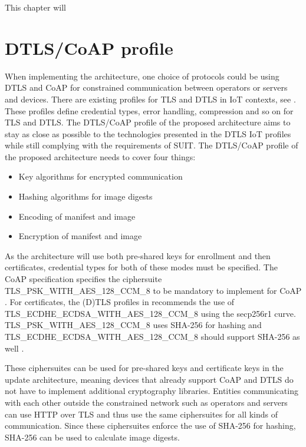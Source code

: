 \documentclass[0-thesis.tex]{subfiles}
\begin{document}
\label{chap:profiles}
This chapter will 

\section{DTLS/CoAP profile}
\label{sec:dtls-coap-profile}
When implementing the architecture, one choice of protocols could be using DTLS and CoAP
for constrained communication between operators or servers and devices. There are existing
profiles for TLS and DTLS in IoT contexts, see \parencite{rfc7925}. These profiles define
credential types, error handling, compression and so on for TLS and DTLS. The DTLS/CoAP
profile of the proposed architecture aims to stay as close as possible to the technologies
presented in the DTLS IoT profiles while still complying with the requirements of SUIT.
The DTLS/CoAP profile of the proposed architecture needs to cover four things:

\begin{itemize}
    \item Key algorithms for encrypted communication
    \item Hashing algorithms for image digests
    \item Encoding of manifest and image
    \item Encryption of manifest and image
\end{itemize}

As the architecture will use both pre-shared keys for enrollment and then certificates,
credential types for both of these modes must be specified. The CoAP specification
specifies the ciphersuite TLS\_PSK\_WITH\_AES\_128\_CCM\_8{} to be mandatory to implement
for CoAP \parencite{rfc7252}. For certificates, the (D)TLS profiles in \parencite{rfc7925}
recommends the use of TLS\_ECDHE\_ECDSA\_WITH\_AES\_128\_CCM\_8{} using the secp256r1
curve. TLS\_PSK\_WITH\_AES\_128\_CCM\_8{} uses SHA-256 for hashing and
TLS\_ECDHE\_ECDSA\_WITH\_AES\_128\_CCM\_8{} should support SHA-256 as well
\parencite{rfc7251}. 

These ciphersuites can be used for pre-shared keys and certificate keys in the update
architecture, meaning devices that already support CoAP and DTLS do not have to implement
additional cryptography libraries. Entities communicating with each other outside the
constrained network such as operators and servers can use HTTP over TLS and thus use the
same ciphersuites for all kinds of communication. Since these ciphersuites enforce the use
of SHA-256 for hashing, SHA-256 can be used to calculate image digests.
\end{document}
